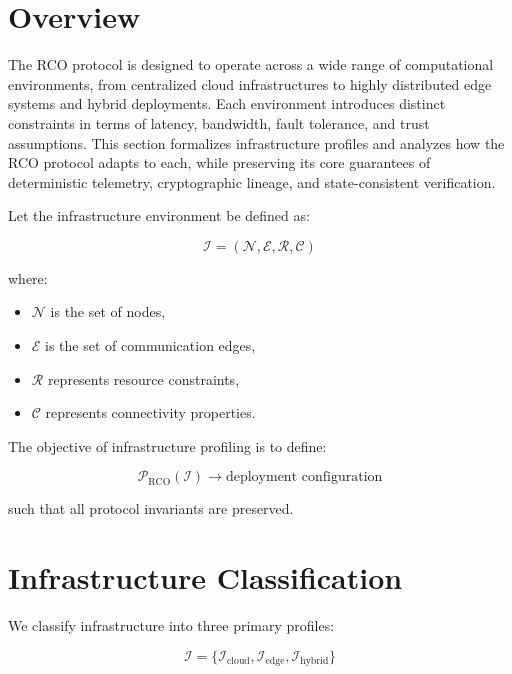\section{Overview}

The RCO protocol is designed to operate across a wide range of computational environments, from centralized cloud infrastructures to highly distributed edge systems and hybrid deployments. Each environment introduces distinct constraints in terms of latency, bandwidth, fault tolerance, and trust assumptions. This section formalizes infrastructure profiles and analyzes how the RCO protocol adapts to each, while preserving its core guarantees of deterministic telemetry, cryptographic lineage, and state-consistent verification.

Let the infrastructure environment be defined as:

\begin{equation}
\mathcal{I} = (\mathcal{N}, \mathcal{E}, \mathcal{R}, \mathcal{C})
\end{equation}

where:
\begin{itemize}
\item $\mathcal{N}$ is the set of nodes,
\item $\mathcal{E}$ is the set of communication edges,
\item $\mathcal{R}$ represents resource constraints,
\item $\mathcal{C}$ represents connectivity properties.
\end{itemize}

The objective of infrastructure profiling is to define:

\begin{equation}
\mathcal{P}_{\text{RCO}}(\mathcal{I}) \rightarrow \text{deployment configuration}
\end{equation}

such that all protocol invariants are preserved.

\section{Infrastructure Classification}

We classify infrastructure into three primary profiles:

\begin{equation}
\mathcal{I} = \{\mathcal{I}_{\text{cloud}}, \mathcal{I}_{\text{edge}}, \mathcal{I}_{\text{hybrid}}\}
\end{equation}

